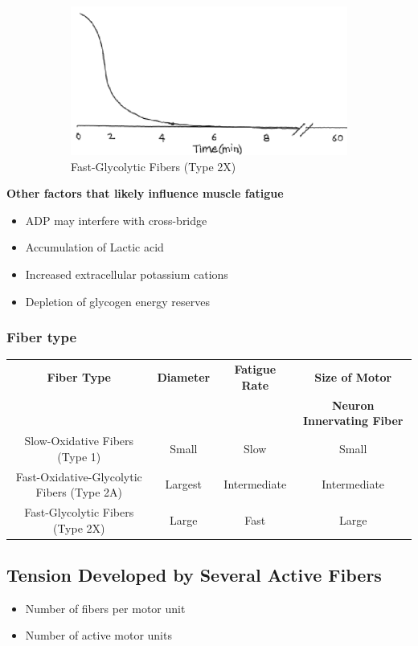 \documentclass[11pt,fleqn]{book}
\begin{document}
\begin{figure}[h!]
    \begin{subfigure}{0.45\textwidth}
        \includegraphics[width=\textwidth]{Pictures/Screenshot 2024-04-03 231449.png}
        \caption{Fast-Glycolytic Fibers
(Type 2X)}
    \end{subfigure}
    \caption{}
\end{figure}

\textbf{Other factors that likely influence muscle fatigue}
\begin{itemize}
    \item ADP may interfere with cross-bridge
    \item Accumulation of Lactic acid
    \item Increased extracellular potassium cations
    \item Depletion of glycogen energy reserves
\end{itemize}

\subsubsection{Fiber type}
\begin{tabular}{cccc}
\textbf{Fiber Type} &  \textbf{Diameter} & \textbf{Fatigue Rate} & \textbf{Size of Motor} \\
 & & & \textbf{Neuron Innervating Fiber}\\
\hline
Slow-Oxidative Fibers (Type 1) & Small & Slow & Small \\
Fast-Oxidative-Glycolytic Fibers (Type 2A)  & Largest & Intermediate & Intermediate  \\
Fast-Glycolytic Fibers (Type 2X)  & Large  & Fast  & Large \\
\end{tabular}


\subsection{Tension Developed by
Several Active Fibers}
\begin{itemize}
    \item Number of fibers per motor unit
    \item Number of active motor units
\end{itemize}
\end{document}
